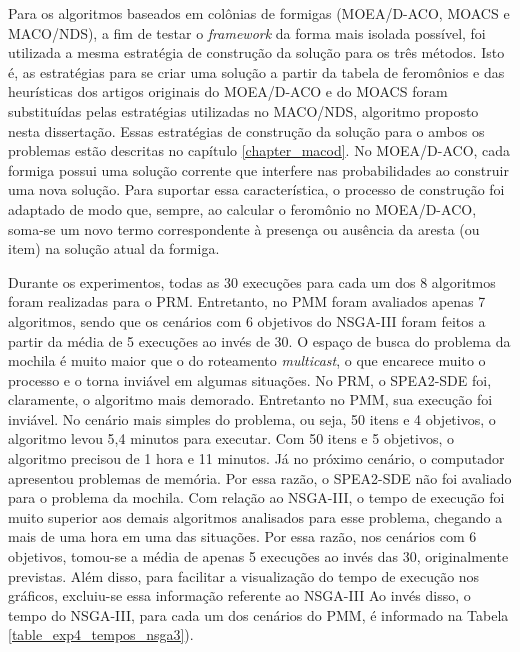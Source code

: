 Para os algoritmos baseados em colônias de formigas (MOEA/D-ACO, MOACS e MACO/NDS), a fim de testar o \textit{framework} da forma mais isolada possível, foi utilizada a mesma estratégia de construção da solução para os três métodos. Isto é, as estratégias para se criar uma solução a partir da tabela de feromônios e das heurísticas dos artigos originais do MOEA/D-ACO e do MOACS foram substituídas pelas estratégias utilizadas no MACO/NDS, algoritmo proposto nesta dissertação. Essas estratégias de construção da solução para o ambos os problemas estão descritas no capítulo \ref{chapter_macod}. No MOEA/D-ACO, cada formiga possui uma solução corrente que interfere nas probabilidades ao construir uma nova solução. Para suportar essa característica, o processo de construção foi adaptado de modo que, sempre, ao calcular o feromônio no MOEA/D-ACO, soma-se um novo termo correspondente à presença ou ausência da aresta (ou item) na solução atual da formiga.

Durante os experimentos, todas as 30 execuções para cada um dos 8 algoritmos foram realizadas para o PRM. Entretanto, no PMM foram avaliados apenas 7 algoritmos, sendo que os cenários com 6 objetivos do NSGA-III foram feitos a partir da média de 5 execuções ao invés de 30. O espaço de busca do problema da mochila é muito maior que o do roteamento \textit{multicast}, o que encarece muito o processo e o torna inviável em algumas situações. No PRM, o SPEA2-SDE foi, claramente, o algoritmo mais demorado. Entretanto no PMM, sua execução foi inviável. No cenário mais simples do problema, ou seja, 50 itens e 4 objetivos, o algoritmo levou 5,4 minutos para executar. Com 50 itens e 5 objetivos, o algoritmo precisou de 1 hora e 11 minutos. Já no próximo cenário, o computador apresentou problemas de memória. Por essa razão, o SPEA2-SDE não foi avaliado para o problema da mochila. Com relação ao NSGA-III, o tempo de execução foi muito superior aos demais algoritmos analisados para esse problema, chegando a mais de uma hora em uma das situações. Por essa razão, nos cenários com 6 objetivos, tomou-se a média de apenas 5 execuções ao invés das 30, originalmente previstas. Além disso, para facilitar a visualização do tempo de execução nos gráficos, excluiu-se essa informação referente ao NSGA-III Ao invés disso, o tempo do NSGA-III, para cada um dos cenários do PMM, é informado na Tabela \ref{table_exp4_tempos_nsga3}). %


